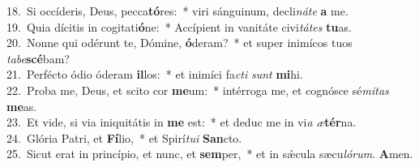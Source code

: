 {18.~}Si occíderis, Deus, pecca\textbf{tó}res:~* viri sánguinum, decli\textit{ná}\textit{te} \textbf{a} me.\\
{19.~}Quia dícitis in cogitati\textbf{ó}ne:~* Accípient in vanitáte civi\textit{tá}\textit{tes} \textbf{tu}as.\\
{20.~}Nonne qui odérunt te, Dómine, \textbf{ó}deram?~* et super inimícos tuos \textit{ta}\textit{be}\textbf{scé}bam?\\
{21.~}Perfécto ódio óderam \textbf{il}los:~* et inimíci fa\textit{cti} \textit{sunt} \textbf{mi}hi.\\
{22.~}Proba me, Deus, et scito cor \textbf{me}um:~* intérroga me, et cognósce sé\textit{mi}\textit{tas} \textbf{me}as.\\
{23.~}Et vide, si via iniquitátis in \textbf{me} est:~* et deduc me in vi\textit{a} \textit{æ}\textbf{tér}na.\\
{24.~}Glória Patri, et \textbf{Fí}lio,~* et Spirí\textit{tu}\textit{i} \textbf{San}cto.\\
{25.~}Sicut erat in princípio, et nunc, et \textbf{sem}per,~* et in sǽcula sæcu\textit{ló}\textit{rum}. \textbf{A}men.\\
